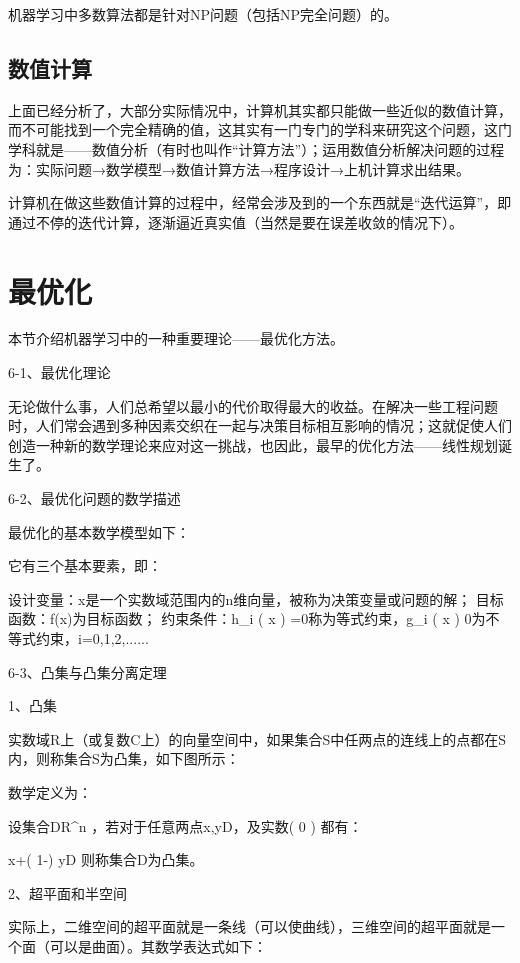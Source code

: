 \documentclass[11pt]{book}
\newcounter{#2}
\newcounter{#2}[#1]
\numberwithin{#2}{#1}
\begin{document}
机器学习中多数算法都是针对NP问题（包括NP完全问题）的。

\subsection{数值计算}

上面已经分析了，大部分实际情况中，计算机其实都只能做一些近似的数值计算，而不可能找到一个完全精确的值，这其实有一门专门的学科来研究这个问题，这门学科就是——数值分析（有时也叫作“计算方法”）；运用数值分析解决问题的过程为：实际问题→数学模型→数值计算方法→程序设计→上机计算求出结果。

计算机在做这些数值计算的过程中，经常会涉及到的一个东西就是“迭代运算”，即通过不停的迭代计算，逐渐逼近真实值（当然是要在误差收敛的情况下）。

\section{最优化}

本节介绍机器学习中的一种重要理论——最优化方法。

6-1、最优化理论

无论做什么事，人们总希望以最小的代价取得最大的收益。在解决一些工程问题时，人们常会遇到多种因素交织在一起与决策目标相互影响的情况；这就促使人们创造一种新的数学理论来应对这一挑战，也因此，最早的优化方法——线性规划诞生了。 

6-2、最优化问题的数学描述

最优化的基本数学模型如下：

它有三个基本要素，即：

设计变量：x是一个实数域范围内的n维向量，被称为决策变量或问题的解；
目标函数：f(x)为目标函数；
约束条件：h_{i} \left( x \right) =0称为等式约束，g_{i} \left( x \right) \leq 0为不等式约束，i=0,1,2,......

6-3、凸集与凸集分离定理

1、凸集

实数域R上（或复数C上）的向量空间中，如果集合S中任两点的连线上的点都在S内，则称集合S为凸集，如下图所示：


数学定义为：

设集合D\subset R^{n} ，若对于任意两点x,y\in D，及实数\lambda \left( 0\leq \lambda {} \right) 都有：

\lambda x+\left( 1-\lambda  \right) y\in D
则称集合D为凸集。

2、超平面和半空间

实际上，二维空间的超平面就是一条线（可以使曲线），三维空间的超平面就是一个面（可以是曲面）。其数学表达式如下：
\end{document}
